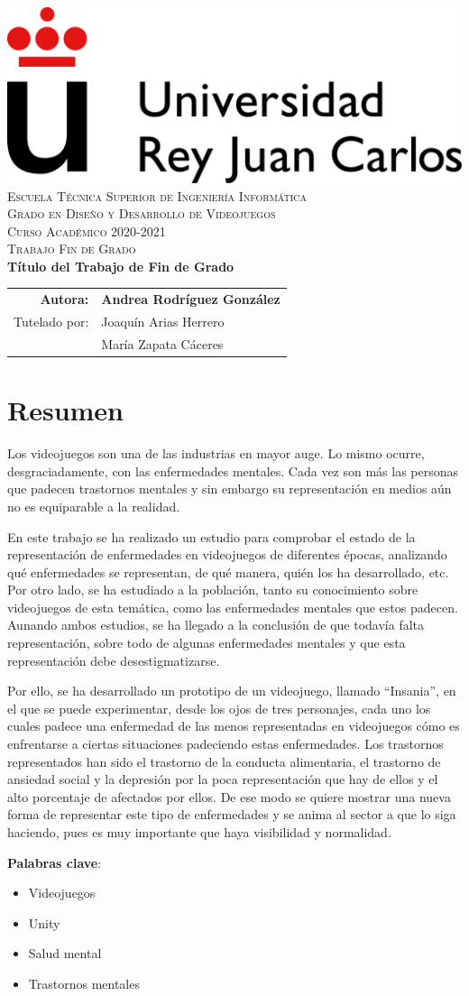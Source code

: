 \documentclass[12pt, a4paper,twoside,titlepage]{book}
\newcommand{\grado}{Grado en Diseño y Desarrollo de Videojuegos}
\newcommand{\titulotrabajo}{Título del Trabajo de Fin de Grado}
\newcommand{\curso}{Curso Académico 2020-2021}
\newcommand{\autor}{Andrea Rodríguez González}
\newcommand{\tutor}{Joaquín Arias Herrero}
\newcommand{\cotutor}{María Zapata Cáceres}
\renewcommand*{\maketitle}{%
\begin{titlepage}
  \pagestyle{plain}

  \begin{center}
    \vspace*{-4em}
    \includegraphics[scale=.9]{URJ_logo_Color_POS}\\
    \vspace*{4em}
    \textsc{\Large Escuela Técnica Superior de Ingeniería Informática}\\
    \vspace*{2em}
    \textsc{\Large \grado}\\  %
    \vspace*{3em}
     \textsc{\large \curso\\}  %
    \vspace*{1.5em}
    \textsc{\large Trabajo Fin de Grado\\}
    \vspace*{13em}
    \textbf{\LARGE \titulotrabajo\\}  %
    \vspace*{5em}
    {%
      \large
      \begin{tabular}{rl}
        \textbf{Autora:} & \textbf{\autor}\\[.5em]
        {Tutelado por:} & {\tutor}\\[-.25em]
                          & {\cotutor}\\
      \end{tabular}
    }
  \end{center}
  
\end{titlepage}
}
\let\origdoublepage\cleardoublepage
\renewcommand{\cleardoublepage}{\clearpage{\pagestyle{empty}\origdoublepage}}
\begin{document}
\maketitle



\cleardoublepage
{}
\setcounter{page}{1}

\chapter*{Resumen}

Los videojuegos son una de las industrias en mayor auge. Lo mismo ocurre, desgraciadamente, con las enfermedades mentales. Cada vez son más las personas que padecen trastornos mentales y sin embargo su representación en medios aún no es equiparable a la realidad. 

En este trabajo se ha realizado un estudio para comprobar el estado de la representación de enfermedades en videojuegos de diferentes épocas, analizando qué enfermedades se representan, de qué manera, quién los ha desarrollado, etc. Por otro lado, se ha estudiado a la población, tanto su conocimiento sobre videojuegos de esta temática, como las enfermedades mentales que estos padecen. Aunando ambos estudios, se ha llegado a la conclusión de que todavía falta representación, sobre todo de algunas enfermedades mentales y que esta representación debe desestigmatizarse. 

Por ello, se ha desarrollado un prototipo de un videojuego, llamado ``Insania'', en el que se puede experimentar, desde los ojos de tres personajes, cada uno los cuales padece una enfermedad de las menos representadas en videojuegos cómo es enfrentarse a ciertas situaciones padeciendo estas enfermedades. Los trastornos representados han sido el trastorno de la conducta alimentaria, el trastorno de ansiedad social y la depresión por la poca representación que hay de ellos y el alto porcentaje de afectados por ellos. De ese modo se quiere mostrar una nueva forma de representar este tipo de enfermedades y se anima al sector a que lo siga haciendo, pues es muy importante que haya visibilidad y normalidad. 


\noindent \textbf{Palabras clave}:
\begin{itemize}
   \item Videojuegos
   \item Unity
   \item Salud mental
   \item Trastornos mentales
\end{itemize}
\end{document}
